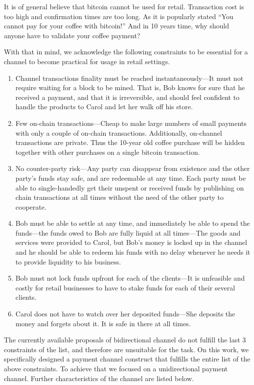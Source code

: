 \documentclass{llncs}
\begin{document}
It is of general believe that bitcoin cannot be used for retail. Transaction
cost is too high and confirmation times are too long. As it is popularly stated
``You cannot pay for your coffee with bitcoin!'' And in 10 years time, why
should anyone have to validate your coffee payment?

With that in mind, we acknowledge the following constraints to be essential for
a channel to become practical for usage in retail settings.

\begin{enumerate}[label=(\roman*)]
\item Channel transactions finality must be reached instantaneously---It must
  not require waiting for a block to be mined. That is, Bob knows for sure that
  he received a payment, and that it is irreversible, and should feel confident
  to handle the products to Carol and let her walk off his store.
\item Few on-chain transactions---Cheap to make large numbers of small payments
  with only a couple of on-chain transactions. Additionally, on-channel
  transactions are private. Thus the 10-year old coffee purchase will be hidden
  together with other purchases on a single bitcoin transaction.
\item No counter-party risk---Any party can disappear from existence and the
  other party's funds stay safe, and are redeemable at any time. Each party must
  be able to single-handedly get their unspent or received funds by publishing
  on chain transactions at all times without the need of the other party to
  cooperate.
\item Bob must be able to settle at any time, and immediately be able to spend
  the funds---the funds owed to Bob are fully liquid at all times---The goods
  and services were provided to Carol, but Bob's money is locked up in the
  channel and he should be able to redeem his funds with no delay whenever he
  needs it to provide liquidity to his business.
\item Bob must not lock funds upfront for each of the clients---It is unfeasible
  and costly for retail businesses to have to stake funds for each of their
  several clients.
\item Carol does not have to watch over her deposited funds---She deposits the
  money and forgets about it. It is safe in there at all times.
\end{enumerate}

The currently available proposals of bidirectional channel do not fulfill the
last 3 constraints of the list, and therefore are unsuitable for the task. On
this work, we specifically designed a payment channel construct that fulfills
the entire list of the above constraints. To achieve that we focused on a
unidirectional payment channel. Further characteristics of the channel are
listed below.
\end{document}
